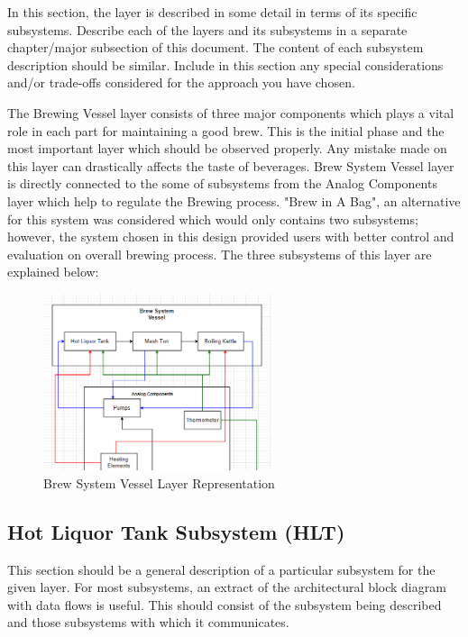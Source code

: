 In this section, the layer is described in some detail in terms of its specific subsystems. Describe each of the layers and its subsystems in a separate chapter/major subsection of this document. The content of each subsystem description should be similar. Include in this section any special considerations and/or trade-offs considered for the approach you have chosen.

The Brewing Vessel layer consists of three major components which plays a vital role in each part for maintaining a good brew. This is the initial phase and the most important layer which should be observed properly. Any mistake made on this layer can drastically affects the taste of beverages. Brew System Vessel layer is directly connected to the some of subsystems from the Analog Components layer which help to regulate the Brewing process. "Brew in A Bag", an alternative for this system was considered which would only contains two subsystems; however, the system chosen in this design provided users with better control and evaluation on overall brewing process. The three subsystems of this layer are explained below:

\begin{figure}[h!]
	\centering
	\includegraphics[width=0.60\textwidth]{images/Brew_System_Vessels}
	\caption{Brew System Vessel Layer Representation}
\end{figure}

\subsection{Hot Liquor Tank Subsystem (HLT)}
This section should be a general description of a particular subsystem for the given layer. For most subsystems, an extract of the architectural block diagram with data flows is useful. This should consist of the subsystem being described and those subsystems with which it communicates.

